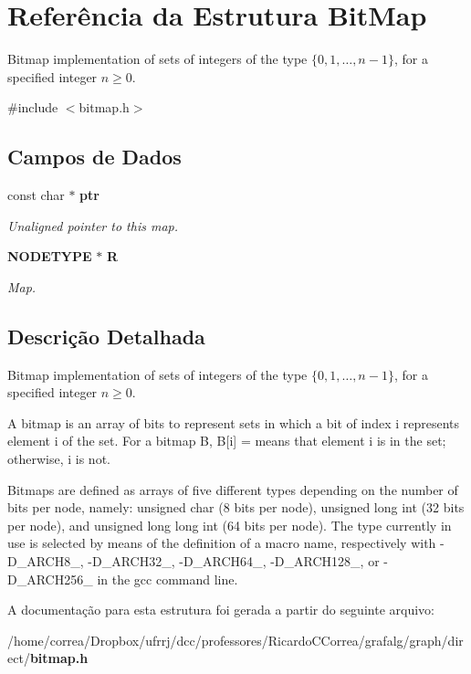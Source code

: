 \section{Referência da Estrutura Bit\+Map}
\label{structBitMap}


Bitmap implementation of sets of integers of the type $\{ 0, 1, \ldots, n-1 \}$, for a specified integer $n \geq 0$.  




{\ttfamily \#include $<$bitmap.\+h$>$}

\subsection*{Campos de Dados}
\begin{DoxyCompactItemize}
\item 
const char $\ast$ {\bf ptr}\label{structBitMap_ab07f45c7b4a2de5e9eb49a826afea3a0}

\begin{DoxyCompactList}\small\item\em Unaligned pointer to this map. \end{DoxyCompactList}\item 
{\bf N\+O\+D\+E\+T\+Y\+PE} $\ast$ {\bf R}\label{structBitMap_aad17fdde2ad579d3abb8228439377bfc}

\begin{DoxyCompactList}\small\item\em Map. \end{DoxyCompactList}\end{DoxyCompactItemize}


\subsection{Descrição Detalhada}
Bitmap implementation of sets of integers of the type $\{ 0, 1, \ldots, n-1 \}$, for a specified integer $n \geq 0$. 

A bitmap is an array of bits to represent sets in which a bit of index {\ttfamily i} represents element {\ttfamily i} of the set. For a bitmap {\ttfamily B}, {\ttfamily B}[{\ttfamily i}] {\ttfamily =} {} means that element {\ttfamily i} is in the set; otherwise, {\ttfamily i} is not.

Bitmaps are defined as arrays of five different types depending on the number of bits per node, namely\+: {\ttfamily unsigned} {\ttfamily char} (8 bits per node), {\ttfamily unsigned} {\ttfamily long} {\ttfamily int} (32 bits per node), and {\ttfamily unsigned} {\ttfamily long} {\ttfamily long} {\ttfamily int} (64 bits per node). The type currently in use is selected by means of the definition of a macro name, respectively with {\ttfamily -\/\+D\+\_\+\+A\+R\+C\+H8\+\_\+}, {\ttfamily -\/\+D\+\_\+\+A\+R\+C\+H32\+\_\+}, {\ttfamily -\/\+D\+\_\+\+A\+R\+C\+H64\+\_\+}, {\ttfamily -\/\+D\+\_\+\+A\+R\+C\+H128\+\_\+}, or {\ttfamily -\/\+D\+\_\+\+A\+R\+C\+H256\+\_\+} in the {\ttfamily gcc} command line. 

A documentação para esta estrutura foi gerada a partir do seguinte arquivo\+:\begin{DoxyCompactItemize}
\item 
/home/correa/\+Dropbox/ufrrj/dcc/professores/\+Ricardo\+C\+Correa/grafalg/graph/direct/{\bf bitmap.\+h}\end{DoxyCompactItemize}
